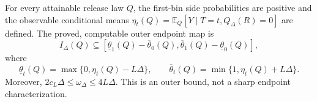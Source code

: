 For every attainable release law \(Q\), the first-bin side probabilities are positive and the observable conditional means \(\eta_t(Q)=\mathbb E_Q[Y\mid T=t,Q_\Delta(R)=0]\) are defined.  The proved, computable outer endpoint map is
\[
 I_\Delta(Q)\subseteq
 [\underline\theta_1(Q)-\overline\theta_0(Q),
   \overline\theta_1(Q)-\underline\theta_0(Q)],
\]
where
\[
 \underline\theta_t(Q)=\max\{0,\eta_t(Q)-L\Delta\},
 \qquad
 \overline\theta_t(Q)=\min\{1,\eta_t(Q)+L\Delta\}.
\]
Moreover, \(2c_L\Delta\leq\omega_\Delta\leq4L\Delta\).  This is an outer bound, not a sharp endpoint characterization.